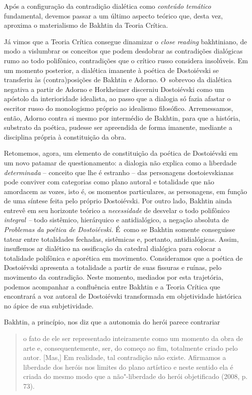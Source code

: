 {{Após a configuração da contradição dialética como \emph{conteúdo
temático} fundamental, devemos passar a um último aspecto teórico que,
desta vez, aproxima o materialismo de Bakhtin da Teoria Crítica.

Já vimos que a Teoria Crítica consegue dinamizar o \emph{close reading}
bakhtiniano, de modo a vislumbrar os conceitos que podem desdobrar as
contradições dialógicas rumo ao todo polifônico, contradições que o
crítico russo considera insolúveis. Em um momento posterior, a dialética
imanente à poética de Dostoiévski se transferiu às (contra)posições de
Bakhtin e Adorno. O~sobrevoo da dialética negativa a partir de Adorno e
Horkheimer discerniu Dostoiévski como um apóstolo da interioridade
idealista, ao passo que a dialogia só fazia afastar o escritor russo do
monologismo próprio ao idealismo filosófico. Arremessamos, então, Adorno
contra si mesmo por intermédio de Bakhtin, para que a história,
substrato da poética, pudesse ser apreendida de forma imanente, mediante
a disciplina própria à constituição da obra.

Retomemos, agora, um elemento de constituição da poética de Dostoiévski
em um novo patamar de questionamento: a dialogia não explica como a
liberdade \emph{determinada} -- conceito que lhe é estranho -- das
personagens dostoievskianas pode conviver com categorias como plano
autoral e totalidade que não amordacem as vozes, isto é, os momentos
particulares, as personagens, em função de uma síntese feita pelo
próprio Dostoiévski. Por outro lado, Bakhtin ainda entrevê em seu
horizonte teórico a \emph{necessidade} de desvelar o todo polifônico
\emph{integral --} todo sistêmico, hierárquico e antidialógico, a
negação absoluta de \emph{Problemas da poética de Dostoiévski.} É~como
se Bakhtin somente conseguisse tatear entre totalidades fechadas,
sistêmicas e, portanto, antidialógicas. Assim, insuflemos ar dialético
na ossificação da catedral dialógica para colocar a totalidade
polifônica e aporética em movimento. Consideramos que a poética de
Dostoiévski apresenta a totalidade a partir de suas fissuras e ruínas,
pelo movimento da contradição. Neste momento, mediados por esta
trajetória, podemos acompanhar a confluência entre Bakhtin e a Teoria
Crítica que encontrará a voz autoral de Dostoiévski transformada em
objetividade histórica no ápice de sua subjetividade.

Bakhtin, a princípio, nos diz que a autonomia do herói parece contrariar

\begin{quote}
o fato de ele ser representado inteiramente como um momento da obra de
arte e, consequentemente, ser, do começo ao fim, totalmente criado pelo
autor. {[}Mas,{]} Em realidade, tal contradição não existe. Afirmamos a
liberdade dos heróis nos limites do plano artístico e neste sentido ela
é criada do mesmo modo que a não"-liberdade do herói objetificado (2008,
p. 73).
\end{quote}

}}
